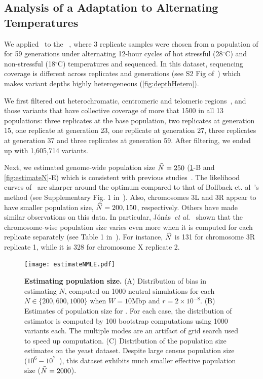 \subsection{Analysis of a \dmel Adaptation to Alternating 
Temperatures}\label{sec:dmel}
We applied \comale\ to the 
\datadm~\cite{orozco2012adaptation,franssen2015patterns}, where
3 replicate samples were chosen from a population of \dmel for 59
generations under alternating 12-hour cycles of  hot stressful (28$^{\circ}$C)
and non-stressful (18$^{\circ}$C) temperatures and sequenced.  In this dataset,
sequencing coverage is different across replicates and generations
(see S2 Fig of~\cite{Terhorst2015Multi}) which makes variant depths
highly heterogeneous (\ref{fig:depthHetero}). 

We first filtered out heterochromatic, centromeric and telomeric
regions~\cite{fiston2010drosophila}, and those variants that have
collective coverage of more that 1500 in all 13 populations: three
replicates at the base population, two replicates at generation 15,
one replicate at generation 23, one replicate at generation 27, three
replicates at generation 37 and three replicates at generation
59. After filtering, we ended up with 1,605,714 variants.

Next, we estimated genome-wide population size $\widehat{N}=250$
(\ref{fig:estimateNMLE}-B and \ref{fig:estimateN}-E) which is consistent with 
previous
studies~\cite{orozco2012adaptation,jonas2016estimating}. The
likelihood curves of \comale\ are sharper around the optimum compared
to that of Bollback et. al~\cite{bollback2008estimation}'s method (see
Supplementary Fig. 1 in~\cite{orozco2012adaptation}).  Also,
chromosomes 3L and 3R appear to have smaller population
size, $\widehat{N}=200,150$, respectively. 
Others have
made similar observations on this data. In particular,
J\'{o}n\'{a}s~\emph{et al.}~\cite{jonas2016estimating} shown that the 
chromosome-wise population
size varies even more when it is computed for each replicate
separately (see Table 1 in~\cite{jonas2016estimating}). For instance,
$\widehat{N}$ is 131 for chromosome 3R replicate 1, while it is 328 for chromosome X 
replicate 2.  

\begin{figure}
	\centering
	\texttt{[image: estimateNMLE.pdf]}
	\caption{{\bf Estimating population size.}  (A) Distribution
		of bias in estimating $N$, computed on 1000 neutral
		simulations for each $N\in\{200,600,1000\}$ when $W=10$Mbp and 
		$r=2\times10^{-8}$. (B) 
		Estimates
		of population size for \datadm. For each case, the
		distribution of estimator is computed by 100 bootstrap
		computations using 1000 variants each. The multiple modes
		are an artifact of grid search used to speed up
		computation. (C) Distribution of the population 	size
		estimates on the yeast dataset.  Despite large census
		population size ($10^6-10^7$~\cite{burke2014standing}), this
		dataset exhibits much smaller effective population size
		($\widehat{N}=2000$). }
	\label{fig:estimateNMLE}
\end{figure}

